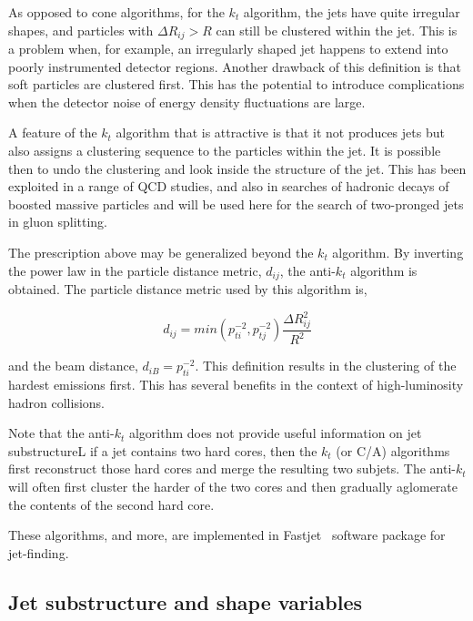 As opposed to cone algorithms, for the $k_t$ algorithm, the jets have quite irregular shapes, and particles with $\Delta R_{ij} > R$ can still be clustered within the jet. This is a problem when, for example, an irregularly shaped jet happens to extend into poorly instrumented detector regions. Another drawback of this definition is that soft particles are clustered first. This  has the potential to introduce complications when the detector noise of energy density fluctuations are large.

A feature of the $k_t$ algorithm that is attractive is that it not produces jets but also assigns a clustering sequence to the particles within the jet. It is possible then to undo the clustering and look inside the structure of the jet. This has been exploited in a range of QCD studies, and also in searches of hadronic decays of boosted massive particles  and will be used here for the search of two-pronged jets in gluon splitting.

The prescription above may be generalized beyond the $k_t$ algorithm. By inverting the power law in the particle distance metric, $d_{ij}$, the anti-$k_t$ algorithm is obtained. The particle distance metric used by this algorithm is,

\begin{equation} 
d_{ij} = min(p^{-2}_{ti},p^{-2}_{tj}) \frac{\Delta R^2_{ij}}{R^2}
\label{eqn:antikt}
\end{equation}

and the  beam distance, $d_{iB}=p^{-2}_{ti}$. This definition results in the clustering of the hardest emissions first. This has several benefits in the context of high-luminosity hadron collisions.

Note that the anti-$k_t$ algorithm does not provide useful information on jet substructureL if a jet contains two hard cores, then the $k_t$ (or C/A) algorithms first reconstruct those hard cores and merge the resulting two subjets. The anti-$k_t$ will often first cluster the harder of the two cores and then gradually aglomerate the contents of the second hard core.

These algorithms, and more, are implemented in {\sc Fastjet}~\cite{fastjet} software package for jet-finding. 


\subsection{Jet substructure and shape variables}\label{sec:substructure}

